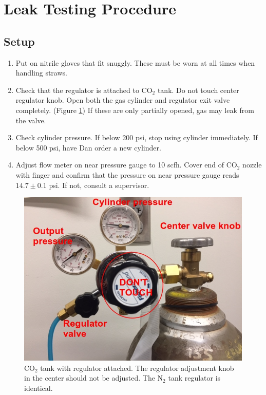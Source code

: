 \documentclass[letterpaper c,12pt]{article}
\begin{document}


\newpage

\section{Leak Testing Procedure}

\subsection{Setup}

\begin{enumerate}
	\item Put on nitrile gloves that fit snuggly. These must be worn at all times when handling straws.
	\item Check that the regulator is attached to CO$_2$ tank. Do not touch center regulator knob. Open both the gas cylinder and regulator exit valve completely. (Figure \ref{co2tank}) If these are only partially opened, gas may leak from the valve.   
	\item Check cylinder pressure. If below 200 psi, stop using cylinder immediately. If below 500 psi, have Dan order a new cylinder.
	\item Adjust flow meter on near pressure gauge to 10 scfh. Cover end of CO$_2$ nozzle with finger and confirm that the pressure on near pressure gauge reads $14.7 \pm 0.1$ psi. If not, consult a supervisor.
\end{enumerate}

\begin{figure}
	\center
	\includegraphics[scale=0.5]{co2tank}
	\caption{CO$_2$ tank with regulator attached. The regulator adjustment knob in the center should not be adjusted. The N$_2$ tank regulator is identical.} \label{co2tank}
\end{figure}
\end{document}
